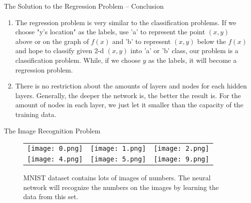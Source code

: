\documentclass{beamer}
\begin{document}
\begin{frame}{The Solution to the Regression Problem -- Conclusion}
\begin{enumerate}
  \item The regression problem is very similar to the classification problems. If we choose "y's location" as the labels, use 'a' to represent the point $(x,y)$ above or on the graph of $f(x)$ and 'b' to represent $(x,y)$ below the $f(x)$ and hope to classify given 2-d $(x,y)$ into 'a' or 'b' class, our problem is a classification problem. While, if we choose $y$ as the labels, it will become a regression problem.
  \item There is no restriction about the amounts of layers and nodes for each hidden layers. Generally, the deeper the network is, the better the result is. For the amount of nodes in each layer, we just let it smaller than the capacity of the training data.
\end{enumerate}

\end{frame}


\begin{frame}{The Image Recognition Problem}
\begin{figure}
  \begin{flushleft}
  \begin{tabular}{p{} p{} p{}}
  \vspace{-20pt}\texttt{[image: 0.png]}&\vspace{-20pt}\texttt{[image: 1.png]}&\vspace{-20pt}\texttt{[image: 2.png]}\\
  \vspace{-20pt}\texttt{[image: 4.png]}&\vspace{-20pt}\texttt{[image: 5.png]}&\vspace{-20pt}\texttt{[image: 9.png]}
  \end{tabular}
  \end{flushleft}
  \caption{MNIST dataset contains lots of images of numbers. The neural network will recognize the numbers on the images by learning the data from this set.}
\end{figure}
\end{frame}
\end{document}
